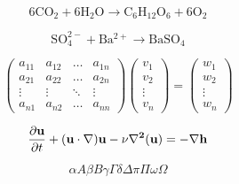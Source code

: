 \documentclass{article}  %
\begin{document}
$$\mathrm{6CO_2+6H_2O \to C_6H_{12}O_6+6O_2}$$   %

$$\mathrm{SO_4^{2-}+Ba^{2+} \to BaSO_4 }$$     %

\begin{equation*}        %
\begin{pmatrix}          %
a_{11}&a_{12}&\dots&a_{1n}\\
a_{21}&a_{22}&\dots&a_{2n}\\
\vdots&\vdots&\ddots&\vdots\\
a_{n1}&a_{n2}&\dots&a_{nn}
\end{pmatrix}            %
\begin{pmatrix}          %
v_{1}\\
v_{2}\\
\vdots\\
v_{n}
\end{pmatrix}            %
=
\begin{pmatrix}          %
w_{1}\\
w_{2}\\
\vdots\\
w_{n}
\end{pmatrix}            %
\end{equation*}

\begin{equation*}
\frac{\partial{\bf{u}}}{\partial{t}}+(\bf{u}\cdot\nabla)\bf{u}-\nu\nabla^2\bf(u)=-\nabla h   %
\end{equation*}          %

\[
\alpha A \beta B \gamma \Gamma \delta \Delta \pi \Pi \omega \Omega %
\]
\end{document}

